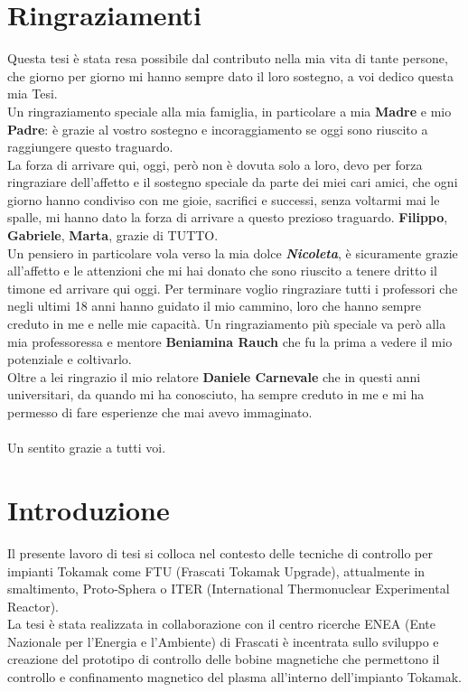\chapter*{Ringraziamenti}
Questa tesi è stata resa possibile dal contributo nella mia vita di tante persone, che giorno per giorno mi hanno sempre dato il loro sostegno, a voi dedico questa mia Tesi.\\
Un ringraziamento speciale alla mia famiglia, in particolare a mia \textbf{Madre} e mio \textbf{Padre}: è grazie al vostro sostegno e incoraggiamento se oggi sono riuscito a raggiungere questo traguardo.\\
La forza di arrivare qui, oggi, però non è dovuta solo a loro, devo per forza ringraziare dell'affetto e il sostegno speciale da parte dei miei cari amici, che ogni giorno hanno condiviso con me gioie, sacrifici e successi, senza voltarmi mai le spalle, mi hanno dato la forza di arrivare a questo prezioso traguardo.
\textbf{Filippo}, \textbf{Gabriele}, \textbf{Marta}, grazie di TUTTO.\\
Un pensiero in particolare vola verso la mia dolce \textbf{\textit{Nicoleta}}, è sicuramente grazie all'affetto e le attenzioni che mi hai donato che sono riuscito a tenere dritto il timone ed arrivare qui oggi.
Per terminare voglio ringraziare tutti i professori che negli ultimi 18 anni hanno guidato il mio cammino, loro che hanno sempre creduto in me e nelle mie capacità. Un ringraziamento più speciale va però alla mia professoressa e mentore \textbf{Beniamina Rauch} che fu la prima a vedere il mio potenziale e coltivarlo.\\
Oltre a lei ringrazio il mio relatore \textbf{Daniele Carnevale} che in questi anni universitari, da quando mi ha conosciuto, ha sempre creduto in me e mi ha permesso di fare esperienze che mai avevo immaginato.\\ \\
Un sentito grazie a tutti voi.\\
%
\chapter*{Introduzione}
Il presente lavoro di tesi si colloca nel contesto delle tecniche di controllo per impianti Tokamak come
FTU (Frascati Tokamak Upgrade), attualmente in smaltimento, Proto-Sphera o ITER (International Thermonuclear Experimental Reactor).\\
La tesi è stata realizzata in collaborazione con il centro ricerche ENEA (Ente Nazionale per l’Energia e l’Ambiente) di Frascati è incentrata sullo sviluppo e creazione del prototipo di controllo delle bobine magnetiche che permettono il controllo e confinamento magnetico del plasma all'interno dell'impianto Tokamak.

